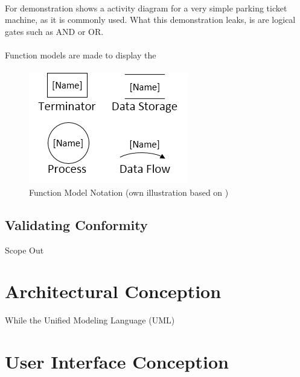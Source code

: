 \paragraph{} For demonstration  shows a activity diagram for a very simple parking ticket machine, as it is commonly used. What this demonstration leaks, is are logical gates such as AND or OR.


\paragraph{} Function models are made to display the 

\paragraph{} 
\begin{figure}[H]
    \centering
    \includegraphics[scale=0.9]{img/fmSymb.png}
    \caption[Function Model Notation]{Function Model Notation (own illustration based on \cite[190]{Pohl.2007})}
    \label{fig:fmSymb}
\end{figure}


\subsection{Validating Conformity}
Scope Out

\section{Architectural Conception}
While the Unified Modeling Language (UML) \parencite[cf.]{}
\subsection{}


\section{User Interface Conception}


